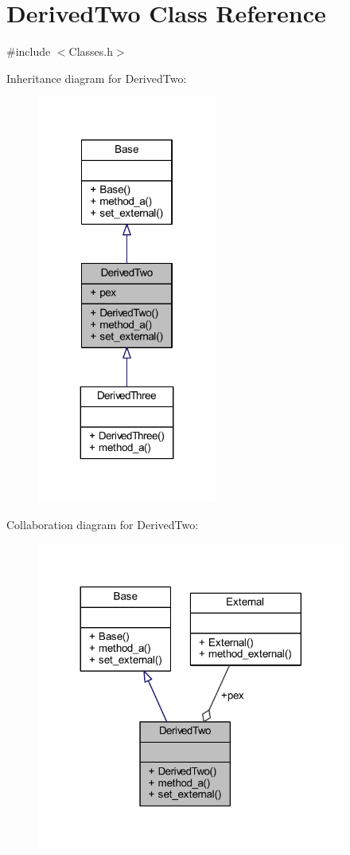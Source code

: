\hypertarget{class_derived_two}{}\section{Derived\+Two Class Reference}
\label{class_derived_two}


{\ttfamily \#include $<$Classes.\+h$>$}



Inheritance diagram for Derived\+Two\+:
\nopagebreak
\begin{figure}[H]
\begin{center}
\leavevmode
\includegraphics[width=167pt]{class_derived_two__inherit__graph}
\end{center}
\end{figure}


Collaboration diagram for Derived\+Two\+:
\nopagebreak
\begin{figure}[H]
\begin{center}
\leavevmode
\includegraphics[width=288pt]{class_derived_two__coll__graph}
\end{center}
\end{figure}
